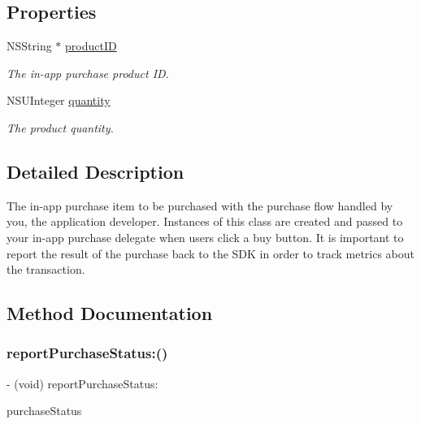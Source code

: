\subsection*{Properties}
\begin{DoxyCompactItemize}
\item 
\mbox{\label{interfaceGADInAppPurchase_a938e9b92c75c34fcef902fec611a0241}} 
N\+S\+String $\ast$ \hyperlink{interfaceGADInAppPurchase_a938e9b92c75c34fcef902fec611a0241}{product\+ID}
\begin{DoxyCompactList}\small\item\em The in-\/app purchase product ID. \end{DoxyCompactList}\item 
\mbox{\label{interfaceGADInAppPurchase_a2a4cbe663cbea8eacd9752b622525a0e}} 
N\+S\+U\+Integer \hyperlink{interfaceGADInAppPurchase_a2a4cbe663cbea8eacd9752b622525a0e}{quantity}
\begin{DoxyCompactList}\small\item\em The product quantity. \end{DoxyCompactList}\end{DoxyCompactItemize}


\subsection{Detailed Description}
The in-\/app purchase item to be purchased with the purchase flow handled by you, the application developer. Instances of this class are created and passed to your in-\/app purchase delegate when users click a buy button. It is important to report the result of the purchase back to the S\+DK in order to track metrics about the transaction. 

\subsection{Method Documentation}
\mbox{\label{interfaceGADInAppPurchase_a76419ac6bdcec994bce5cbf721bb9d5b}} 
\subsubsection{\texorpdfstring{report\+Purchase\+Status\+:()}{reportPurchaseStatus:()}}
{\footnotesize\ttfamily -\/ (void) report\+Purchase\+Status\+: \begin{DoxyParamCaption}\item[{(G\+A\+D\+In\+App\+Purchase\+Status)}]{purchase\+Status }\end{DoxyParamCaption}}

